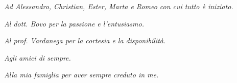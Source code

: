 \thispagestyle{empty}
{}

\vspace*{3cm}

\begin{flushright}
	\emph{Ad Alessandro, Christian, Ester, Marta e Romeo con cui tutto è iniziato.}
	
	\emph{Al dott. Bovo per la passione e l'entusiasmo.}
	
	\emph{Al prof. Vardanega per la cortesia e la disponibilità.}
	
	\emph{Agli amici di sempre.}
		
	\emph{Alla mia famiglia per aver sempre creduto in me.}
\end{flushright}
